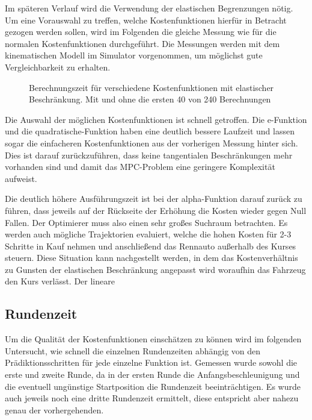 \documentclass{like}
\begin{document}
Im späteren Verlauf wird die Verwendung der elastischen Begrenzungen nötig. Um eine Vorauswahl zu treffen, welche Kostenfunktionen hierfür in Betracht gezogen werden sollen, wird im Folgenden die gleiche Messung wie für die normalen Kostenfunktionen durchgeführt. Die Messungen werden mit dem kinematischen Modell im Simulator vorgenommen, um möglichst gute Vergleichbarkeit zu erhalten.

\begin{figure}
	\centering
	 
	\caption{Berechnungszeit für verschiedene Kostenfunktionen mit elastischer Beschränkung. Mit und ohne die ersten 40 von 240 Berechnungen}
	\label{fig:computeCostSoftConst}
\end{figure}

Die Auswahl der möglichen Kostenfunktionen ist schnell getroffen. Die e-Funktion und die quadratische-Funktion haben eine deutlich bessere Laufzeit und lassen sogar die einfacheren Kostenfunktionen aus der vorherigen Messung hinter sich. Dies ist darauf zurückzuführen, dass keine tangentialen Beschränkungen mehr vorhanden sind und damit das \ac{MPC}-Problem eine geringere Komplexität aufweist.

Die deutlich höhere Ausführungszeit ist bei der alpha-Funktion darauf zurück zu führen, dass jeweils auf der Rückseite der Erhöhung die Kosten wieder gegen Null Fallen. Der Optimierer muss also einen sehr großes Suchraum betrachten. Es werden auch mögliche Trajektorien evaluiert, welche die hohen Kosten für 2-3 Schritte in Kauf nehmen und anschließend das Rennauto außerhalb des Kurses steuern. Diese Situation kann nachgestellt werden, in dem das Kostenverhältnis zu Gunsten der elastischen Beschränkung angepasst wird woraufhin das Fahrzeug den Kurs verlässt. Der lineare 

\subsection{Rundenzeit}
Um die Qualität der Kostenfunktionen einschätzen zu können wird im folgenden Untersucht, wie schnell die einzelnen Rundenzeiten abhängig von den Prädiktionsschritten für jede einzelne Funktion ist.
Gemessen wurde sowohl die erste und zweite Runde, da in der ersten Runde die Anfangsbeschleunigung und die eventuell ungünstige Startposition die Rundenzeit beeinträchtigen. Es wurde auch jeweils noch eine dritte Rundenzeit ermittelt, diese entspricht aber nahezu genau der vorhergehenden.

\begin{figure}
	\centering
	 
	\caption{}
	\label{fig:lapTimeKin}
\end{figure}
\end{document}
